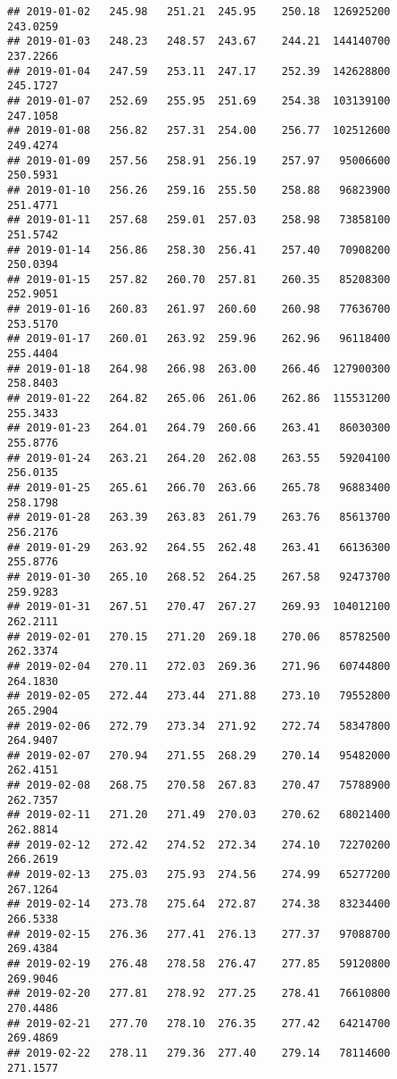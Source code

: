 \documentclass[
]{article}
\begin{document}
\begin{verbatim}
## 2019-01-02   245.98   251.21  245.95    250.18  126925200     243.0259
## 2019-01-03   248.23   248.57  243.67    244.21  144140700     237.2266
## 2019-01-04   247.59   253.11  247.17    252.39  142628800     245.1727
## 2019-01-07   252.69   255.95  251.69    254.38  103139100     247.1058
## 2019-01-08   256.82   257.31  254.00    256.77  102512600     249.4274
## 2019-01-09   257.56   258.91  256.19    257.97   95006600     250.5931
## 2019-01-10   256.26   259.16  255.50    258.88   96823900     251.4771
## 2019-01-11   257.68   259.01  257.03    258.98   73858100     251.5742
## 2019-01-14   256.86   258.30  256.41    257.40   70908200     250.0394
## 2019-01-15   257.82   260.70  257.81    260.35   85208300     252.9051
## 2019-01-16   260.83   261.97  260.60    260.98   77636700     253.5170
## 2019-01-17   260.01   263.92  259.96    262.96   96118400     255.4404
## 2019-01-18   264.98   266.98  263.00    266.46  127900300     258.8403
## 2019-01-22   264.82   265.06  261.06    262.86  115531200     255.3433
## 2019-01-23   264.01   264.79  260.66    263.41   86030300     255.8776
## 2019-01-24   263.21   264.20  262.08    263.55   59204100     256.0135
## 2019-01-25   265.61   266.70  263.66    265.78   96883400     258.1798
## 2019-01-28   263.39   263.83  261.79    263.76   85613700     256.2176
## 2019-01-29   263.92   264.55  262.48    263.41   66136300     255.8776
## 2019-01-30   265.10   268.52  264.25    267.58   92473700     259.9283
## 2019-01-31   267.51   270.47  267.27    269.93  104012100     262.2111
## 2019-02-01   270.15   271.20  269.18    270.06   85782500     262.3374
## 2019-02-04   270.11   272.03  269.36    271.96   60744800     264.1830
## 2019-02-05   272.44   273.44  271.88    273.10   79552800     265.2904
## 2019-02-06   272.79   273.34  271.92    272.74   58347800     264.9407
## 2019-02-07   270.94   271.55  268.29    270.14   95482000     262.4151
## 2019-02-08   268.75   270.58  267.83    270.47   75788900     262.7357
## 2019-02-11   271.20   271.49  270.03    270.62   68021400     262.8814
## 2019-02-12   272.42   274.52  272.34    274.10   72270200     266.2619
## 2019-02-13   275.03   275.93  274.56    274.99   65277200     267.1264
## 2019-02-14   273.78   275.64  272.87    274.38   83234400     266.5338
## 2019-02-15   276.36   277.41  276.13    277.37   97088700     269.4384
## 2019-02-19   276.48   278.58  276.47    277.85   59120800     269.9046
## 2019-02-20   277.81   278.92  277.25    278.41   76610800     270.4486
## 2019-02-21   277.70   278.10  276.35    277.42   64214700     269.4869
## 2019-02-22   278.11   279.36  277.40    279.14   78114600     271.1577

\end{verbatim}
\end{document}
